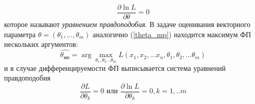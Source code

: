 \documentclass{article}
\begin{document}
\begin{equation}
\frac{\partial \ln L}{\partial \theta}= 0
\label{log_m=0}
\end{equation}
которое называют \textit{уравнением правдоподобия}.
В задаче оценивания векторного параметра $\theta = (\theta_{1}, ... ,\theta_{m})$ аналогично (\ref{theta_mp}) находится максимум ФП нескольких аргументов: 
\begin{equation}
\hat{\theta_{мп}} = \arg \max_{\theta_{1}, \theta_{2}...\theta_{m}} L(x_{1}, x_{2},...x_{n}, \theta_{1}, \theta_{2},...\theta_{m})
\label{multi_theta}
\end{equation}
и в случае дифференцируемости ФП выписывается система уравнений правдоподобия
\begin{equation}
\frac{\partial L}{\partial \theta_{k}} = 0 \text{  или  } \frac{\partial \ln L}{\partial \theta_{k}} = 0, k = 1,..m
\end{equation}
\end{document}

